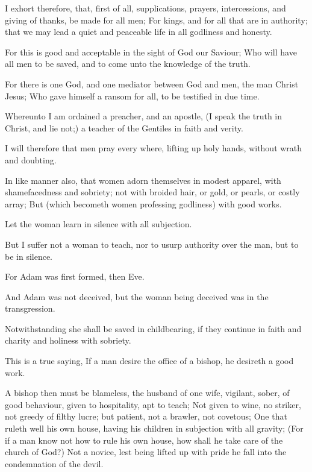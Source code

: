 \Chapter
\Verse I exhort therefore, that, first of all, supplications, prayers, intercessions, and giving of thanks, be made for all men; \Verse For kings, and for all that are in authority; that we may lead a quiet and peaceable life in all godliness and honesty.

\Verse For this is good and acceptable in the sight of God our Saviour; \Verse Who will have all men to be saved, and to come unto the knowledge of the truth.

\Verse For there is one God, and one mediator between God and men, the man Christ Jesus; \Verse Who gave himself a ransom for all, to be testified in due time.

\Verse Whereunto I am ordained a preacher, and an apostle, (I speak the truth in Christ, and lie not;) a teacher of the Gentiles in faith and verity.

\Verse I will therefore that men pray every where, lifting up holy hands, without wrath and doubting.

\Verse In like manner also, that women adorn themselves in modest apparel, with shamefacedness and sobriety; not with broided hair, or gold, or pearls, or costly array; \Verse But (which becometh women professing godliness) with good works.

\Verse Let the woman learn in silence with all subjection.

\Verse But I suffer not a woman to teach, nor to usurp authority over the man, but to be in silence.

\Verse For Adam was first formed, then Eve.

\Verse And Adam was not deceived, but the woman being deceived was in the transgression.

\Verse Notwithstanding she shall be saved in childbearing, if they continue in faith and charity and holiness with sobriety.


\Chapter
\Verse This is a true saying, If a man desire the office of a bishop, he desireth a good work.

\Verse A bishop then must be blameless, the husband of one wife, vigilant, sober, of good behaviour, given to hospitality, apt to teach; \Verse Not given to wine, no striker, not greedy of filthy lucre; but patient, not a brawler, not covetous; \Verse One that ruleth well his own house, having his children in subjection with all gravity; \Verse (For if a man know not how to rule his own house, how shall he take care of the church of God?)  \Verse Not a novice, lest being lifted up with pride he fall into the condemnation of the devil.

